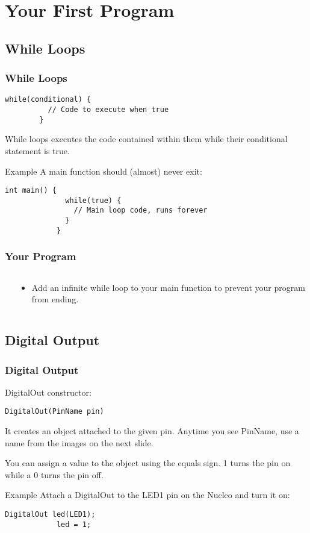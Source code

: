 \section{Your First Program}
\label{sec:first_program}

\subsection{While Loops}
\label{sub:while_loops}
\begin{frame}[fragile]
	\frametitle{While Loops}
	\begin{lstlisting}[keepspaces=true]
		while(conditional) {
		  // Code to execute when true
		}
	\end{lstlisting}
	While loops executes the code contained within them while their conditional statement is true.
	\begin{block}{Example}
		A main function should (almost) never exit:
		\begin{lstlisting}[keepspaces=true]
			int main() {
			  while(true) {
			    // Main loop code, runs forever
			  }
			}
		\end{lstlisting}
	\end{block}
\end{frame}

\begin{frame}
	\frametitle{Your Program}
	\begin{columns}[c]
		\begin{column}{0.5\textwidth}
			
		\end{column}
		\begin{column}{0.5\textwidth}
			\begin{itemize}
				\item Add an infinite while loop to your main function to prevent your program from ending.
			\end{itemize}
		\end{column}
	\end{columns}
\end{frame}

\subsection{Digital Output}
\label{sub:digital_output}
\begin{frame}[fragile]
	\frametitle{Digital Output}
	DigitalOut constructor:
	\begin{lstlisting}[numbers=none]
		DigitalOut(PinName pin)
	\end{lstlisting}
	It creates an object attached to the given pin. Anytime you see PinName, use a name from the images on the next slide.
	
	You can assign a value to the object using the equals sign. 1 turns the pin on while a 0 turns the pin off.
	\begin{block}{Example}
		Attach a DigitalOut to the LED1 pin on the Nucleo and turn it on:
		\begin{lstlisting}[numbers=none]
			DigitalOut led(LED1);
			led = 1;
		\end{lstlisting}
	\end{block}
\end{frame}

